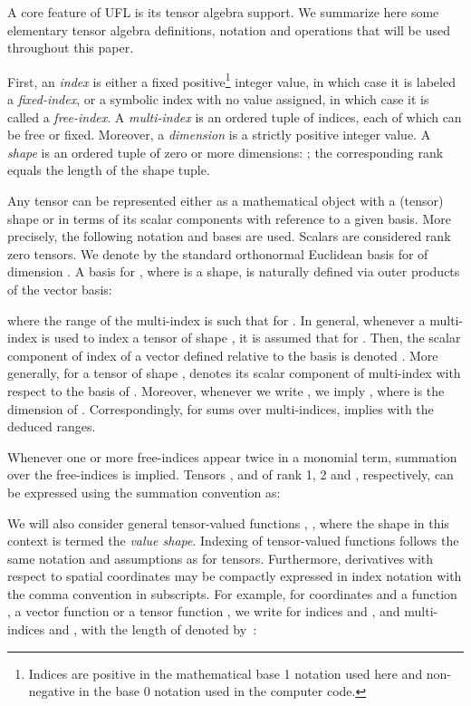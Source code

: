 \documentclass[prodmode,acmtoms]{acmsmall}
\begin{document}
A core feature of UFL is its tensor algebra support. We summarize here
some elementary tensor algebra definitions, notation and operations that
will be used throughout this paper.

First, an \emph{index} is either a fixed positive\footnote{Indices are
  positive in the mathematical base 1 notation used here and
  non-negative in the base 0 notation used in the computer code.}
integer value, in which case it is labeled a \emph{fixed-index}, or a
symbolic index with no value assigned, in which case it is called a
\emph{free-index}. A \emph{multi-index} is an ordered tuple of
indices, each of which can be free or fixed. Moreover, a
\emph{dimension} is a strictly positive integer value. A \emph{shape}  is an
ordered tuple of zero or more dimensions: ; the
corresponding rank  equals the length of the shape
tuple.

Any tensor can be represented either as a mathematical object with a
(tensor) shape or in terms of its scalar
components with reference to a given basis. More precisely, the
following notation and bases are used. Scalars are considered rank
zero tensors. We denote by  the standard
orthonormal Euclidean basis for  of dimension . A basis
 for , where 
is a shape, is naturally defined via outer products of the vector
basis:

where the range of the multi-index  is such that  for . In general, whenever a multi-index  is used to
index a tensor of shape , it is assumed that  for . Then, the scalar
component of index  of a vector  defined relative to the basis
 is denoted . More generally, for a tensor  of
shape ,  denotes its scalar component of multi-index
 with respect to the basis  of
. Moreover, whenever we write , we imply
, where  is the dimension of
. Correspondingly, for sums over multi-indices,  implies  with
the deduced ranges.

Whenever one or more free-indices appear twice in a monomial term,
summation over the free-indices is implied. Tensors ,  and 
of rank 1, 2 and , respectively, can be expressed using the summation
convention as:


We will also consider general tensor-valued functions , , where the shape  in this
context is termed the \emph{value shape}. Indexing of tensor-valued
functions follows the same notation and assumptions as for
tensors. Furthermore, derivatives with respect to spatial coordinates
may be compactly expressed in index notation with the comma convention
in subscripts. For example, for coordinates  and a function , a vector function
 or a tensor function , we write for indices  and , and multi-indices
 and , with the length of  denoted by~:
\end{document}
